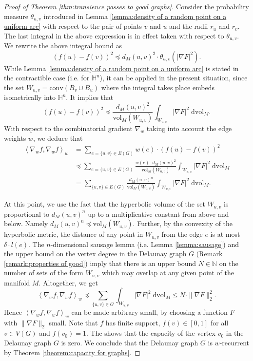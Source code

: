 \documentclass{amsart}
\newcommand{\NN}{\mathbb{N}}
\newcommand{\HH}{\mathbb{H}}
\theoremstyle{plain}
\numberwithin{equation}{section}
\theoremstyle{definition}
\begin{document}
\begin{proof}[Proof of Theorem \ref{thm:transience passes to good graphs}]
 Consider the probability measure $\theta_{u,v}$ introduced in Lemma \ref{lemma:density of a random point on a uniform arc} with respect to the pair of points $v$ and $u$ and the  radii $r_u$ and $r_v$. 
The last integral in the above expression is in effect taken with respect to  $\theta_{u,v}$.  We  rewrite the above integral bound as 
$$ ( f(u) - f(v))^2 \preceq d_M(u,v)^2 \cdot \theta_{u,v}(|\nabla F|^2). $$
While Lemma \ref{lemma:density of a random point on a uniform arc} is stated in the contractible case (i.e. for $\HH^n$), it can be applied in the present situation, since the set $W_{u,v} = \mathrm{conv}(B_v \cup B_u)$ where the integral takes  place  embeds isometrically into $\HH^n$. It implies that 
$$ ( f(u) - f(v))^2 \preceq \frac{ d_M(u,v)^2}{\mathrm{vol}_M(W_{u,v})}  \int_{W_{u,v}} |\nabla F|^2\; \mathrm{d}\mathrm{vol}_M. $$
With respect to the combinatorial gradient $\nabla_w$ taking into account the edge weights $w$, we deduce that 
\begin{align*}
 \left<\nabla_w f,\nabla_w f\right>_w &= \sum_{ e=\{u,v\} \in E(G)} w(e) \cdot  (f(u)-f(v))^2  \\ 
 &\preceq \sum_{e= \{u,v\} \in E(G)} \frac{w(e) \cdot d_M(u,v)^2}{\mathrm{vol}_M(W_{u,v})}  \int_{W_{u,v}} |\nabla F|^2\; \mathrm{d}\mathrm{vol}_M  \\
 &= \sum_{ \{u,v\} \in E(G)} \frac{d_M(u,v)^{n} }{\mathrm{vol}_M(W_{u,v})}  \int_{W_{u,v}} |\nabla F|^2\; \mathrm{d}\mathrm{vol}_M.
 \end{align*}


At this point, we use the fact that the hyperbolic volume of the set $W_{u,v}$ is proportional to  $d_M(u,v)^n$ up to a multiplicative constant from above and below. Namely $d_M(u,v)^n \preceq \mathrm{vol}_M(W_{u,v})$. Further, by the convexity of the hyperbolic metric, the distance of any point in $W_{u,v}$ from the edge $e$ is at most  $\delta \cdot l(e)$.
The $n$-dimensional sausage lemma (i.e. Lemma \ref{lemma:sausage}) and the upper bound on the vertex degree in the Delaunay graph $G$ (Remark \ref{remark:properties of good}) imply that there is an upper bound $N \in \NN$ on the number of sets of the form $W_{u,v}$ which may overlap at any given point of the manifold $M$. 
Altogether, we get
 $$
  \left<\nabla_w f, \nabla_w f\right>_w \preceq  \sum_{ \{u,v\} \in G}\int_{W_{u,v}} |\nabla F|^2\; \mathrm{d}\mathrm{vol}_M
  \le  N \cdot \|\nabla F\|_2^2.
 $$
Hence $\left<\nabla_w f, \nabla_w f\right>_w$ can be made arbitrary small, by choosing a  function $F$ with $\|\nabla F\|_2$  small. Note that $f$ has finite support, $f(v) \in \left[0,1\right]$ for all $v \in V(G)$ and $f(v_0) = 1$. The shows that the capacity of the vertex $v_0$ in the Delaunay graph $G$ is zero. We conclude that the Delaunay graph $G$ is $w$-recurrent by Theorem \ref{theorem:capacity for graphs}.
\end{proof}
\end{document}

